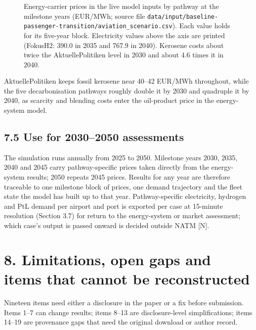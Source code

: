 \documentclass[11pt,a4paper]{article}
\begin{document}
\begin{figure}[htbp]
\caption{Energy-carrier prices in the live model inputs by pathway at the milestone years (EUR/MWh; source file \texttt{data/\allowbreak input/\allowbreak baseline-passenger-transition/\allowbreak aviation\_scenario.csv}). Each value holds for its five-year block. Electricity values above the axis are printed (FokusH2: 390.0 in 2035 and 767.9 in 2040). Kerosene costs about twice the AktuellePolitiken level in 2030 and about 4.6 times it in 2040.}
\label{fig:prices}
\end{figure}

AktuellePolitiken keeps fossil kerosene near 40–42 EUR/MWh throughout, while the five decarbonisation pathways roughly double it by 2030 and quadruple it by 2040, as scarcity and blending costs enter the oil-product price in the energy-system model.

\subsection*{7.5 Use for 2030–2050 assessments}

The simulation runs annually from 2025 to 2050. Milestone years 2030, 2035, 2040 and 2045 carry pathway-specific prices taken directly from the energy-system results; 2050 repeats 2045 prices. Results for any year are therefore traceable to one milestone block of prices, one demand trajectory and the fleet state the model has built up to that year. Pathway-specific electricity, hydrogen and PtL demand per airport and port is exported per case at 15-minute resolution (Section 3.7) for return to the energy-system or market assessment; which case's output is passed onward is decided outside NATM [N].

\section*{8. Limitations, open gaps and items that cannot be reconstructed}

Nineteen items need either a disclosure in the paper or a fix before submission. Items 1–7 can change results; items 8–13 are disclosure-level simplifications; items 14–19 are provenance gaps that need the original download or author record.
\end{document}
